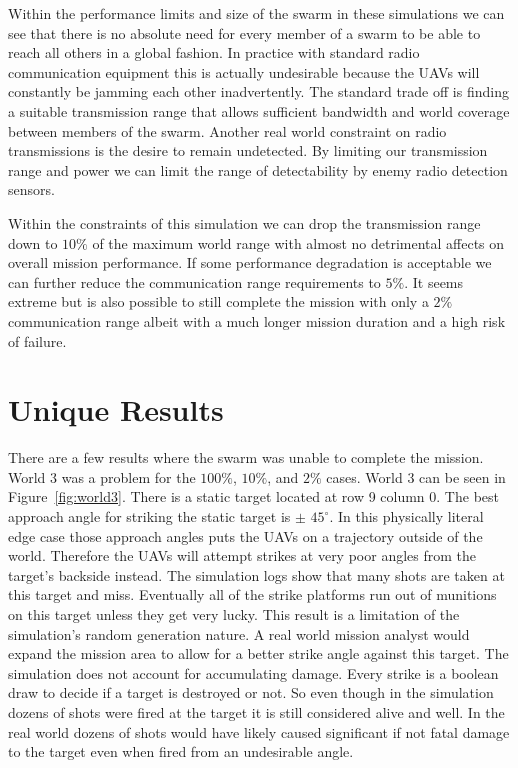 \begin{multicols*}{2}
Within the performance limits and size of the swarm in these simulations we can see that there is no absolute need for every member of a swarm to be able to reach all others in a global fashion.  In practice with standard radio communication  equipment this is actually undesirable because the UAVs will constantly be jamming each other inadvertently.  The standard trade off is finding a suitable transmission range that allows sufficient bandwidth and world coverage between members of the swarm.  Another real world constraint on radio transmissions is the desire to remain undetected.  By limiting our transmission range and power we can limit the range of detectability by enemy radio detection sensors.

Within the constraints of this simulation we can drop the transmission range down to $10\%$ of the maximum world range with almost no detrimental affects on overall mission performance.  If some performance degradation is acceptable we can further reduce the communication range requirements to $5\%$.  It seems extreme but is also possible to still complete the mission with only a $2\%$ communication range albeit with a much longer mission duration and a high risk of failure.

\section{Unique Results}
There are a few results where the swarm was unable to complete the mission.  World 3 was a problem for the $100\%$, $10\%$, and $2\%$ cases.  World 3 can be seen in Figure~\ref{fig:world3}.  There is a static target located at row 9 column 0.  The best approach angle for striking the static target is $\pm$ $45^{\circ}$.  In this physically literal edge case those approach angles puts the UAVs on a trajectory outside of the world.  Therefore the UAVs will attempt strikes at very poor angles from the target's backside instead.  The simulation logs show that many shots are taken at this target and miss.  Eventually all of the strike platforms run out of munitions on this target unless they get very lucky.  This result is a limitation of the simulation's random generation nature.  A real world mission analyst would expand the mission area to allow for a better strike angle against this target.  The simulation does not account for accumulating damage.  Every strike is a boolean draw to decide if a target is destroyed or not.  So even though in the simulation dozens of shots were fired at the target it is still considered alive and well.  In the real world dozens of shots would have likely caused significant if not fatal damage to the target even when fired from an undesirable angle.


\end{multicols*}
